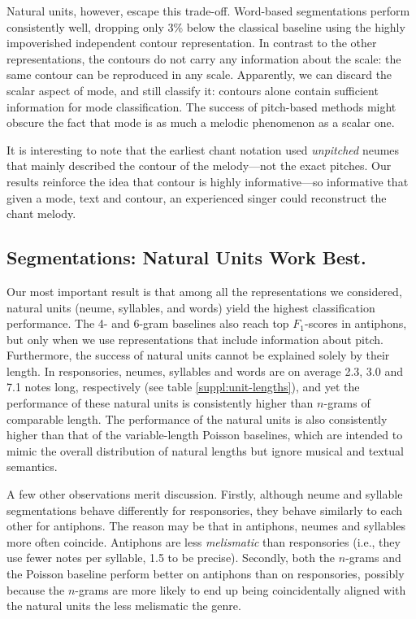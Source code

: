 \documentclass{article}
\begin{document}
Natural units, however, escape this trade-off.
Word-based segmentations perform consistently well, dropping only 3\% below the classical baseline using the highly impoverished independent contour representation.
In contrast to the other representations, the contours do not carry any information about the scale: the same contour can be reproduced in any scale.
Apparently, we can discard the scalar aspect of mode, and still classify it: contours alone contain sufficient information for mode classification.
The success of pitch-based methods might obscure the fact that mode is as much a melodic phenomenon as a scalar one.


It is interesting to note that the earliest chant notation used \emph{unpitched} neumes that mainly described the contour of the melody---not the exact pitches.
Our results reinforce the idea that contour is highly informative---so informative that given a mode, text and contour, an experienced singer could reconstruct the chant melody.




\subsection{Segmentations: Natural Units Work Best.}

Our most important result is that among all the representations we considered, natural units (neume, syllables, and words) yield the highest classification performance.
The 4- and 6-gram baselines also reach top $F_1$-scores in antiphons, but only when we use representations that include information about pitch.
Furthermore, the success of natural units cannot be explained solely by their length.
In responsories, neumes, syllables and words are on average 2.3, 3.0 and 7.1 notes long, respectively (see table \ref{suppl:unit-lengths}), and yet the performance of these natural units is consistently higher than $n$-grams of comparable length. The performance of the natural units is also consistently higher than that of the variable-length Poisson baselines, which are intended to mimic the overall distribution of natural lengths but ignore musical and textual semantics.

A few other observations merit discussion.
Firstly, although neume and syllable segmentations behave differently for responsories, they behave similarly to each other for antiphons.
The reason may be that in antiphons, neumes and syllables more often coincide.
Antiphons are less \emph{melismatic} than responsories (i.e., they use fewer notes per syllable, 1.5 to be precise).
Secondly, both the $n$-grams and the Poisson baseline perform better on antiphons than on responsories, possibly because the $n$-grams are more likely to end up being coincidentally aligned with the natural units the less melismatic the genre.
\end{document}
